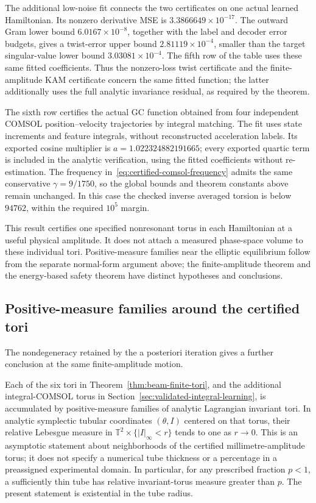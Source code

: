 The additional low-noise fit connects the two certificates on one actual
learned Hamiltonian. Its nonzero derivative MSE is
$3.3866649\times10^{-17}$. The outward Gram lower bound
$6.0167\times10^{-8}$, together with the label and decoder error budgets,
gives a twist-error upper bound $2.81119\times10^{-4}$, smaller than
the target singular-value lower bound $3.03081\times10^{-4}$.
The fifth row of the table uses these same fitted coefficients. Thus
the nonzero-loss twist certificate and the finite-amplitude
KAM certificate concern the same fitted function; the latter additionally
uses the full analytic invariance residual, as required by the theorem.

The sixth row certifies the actual GC function obtained from four
independent COMSOL position--velocity trajectories by integral matching.
The fit uses state increments and feature integrals, without reconstructed
acceleration labels. Its exported cosine multiplier is
$a=1.022324882191665$; every exported quartic term is included in
the analytic verification, using the fitted coefficients without
re-estimation. The frequency in~\eqref{eq:certified-comsol-frequency}
admits the same conservative
$\gamma=9/1750$, so the global bounds and theorem constants above
remain unchanged. In this case the checked inverse averaged torsion
is below $94762$, within the required $10^5$ margin.

This result certifies one specified nonresonant torus in each Hamiltonian
at a useful physical amplitude. It does not attach a measured phase-space
volume to these individual tori. Positive-measure families near the elliptic
equilibrium follow from the separate normal-form argument above;
the finite-amplitude theorem and the energy-based safety theorem have
distinct hypotheses and conclusions.

\subsection{Positive-measure families around the certified tori}
\label{sec:certified-torus-families}

The nondegeneracy retained by the a posteriori iteration gives a further
conclusion at the same finite-amplitude motion.

\begin{corollary}
\label{cor:finite-torus-families}
Each of the six tori in Theorem~\ref{thm:beam-finite-tori}, and the
additional integral-COMSOL torus in
Section~\ref{sec:validated-integral-learning}, is accumulated by
positive-measure families of analytic Lagrangian invariant tori.
In analytic symplectic tubular coordinates $(\theta,I)$ centered on that
torus, their relative Lebesgue measure in
$\mathbb T^2\times\{|I|_\infty<r\}$ tends to one as $r\to0$.
This is an asymptotic statement about neighborhoods of the certified
millimetre-amplitude torus; it does not specify a numerical tube
thickness or a percentage in a preassigned experimental domain.
In particular, for any prescribed fraction $p<1$, a sufficiently thin
tube has relative invariant-torus measure greater than $p$. The present
statement is existential in the tube radius.
\end{corollary}

